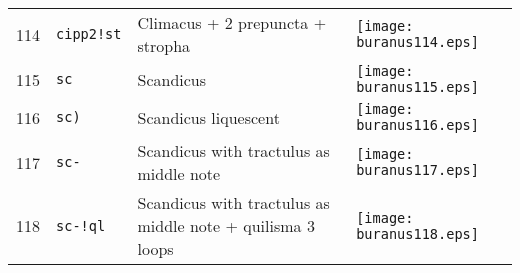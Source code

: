 \documentclass{scrarticle}
\begin{document}
\begin{longtable}{l|l|l|l}
114 & \texttt{cipp2!st} & Climacus + 2 prepuncta + stropha & \texttt{[image: buranus114.eps]} \\
115 & \texttt{sc} & Scandicus & \texttt{[image: buranus115.eps]} \\
116 & \texttt{sc)} & Scandicus liquescent & \texttt{[image: buranus116.eps]} \\
117 & \texttt{sc-} & Scandicus with tractulus as middle note & \texttt{[image: buranus117.eps]} \\
118 & \texttt{sc-!ql} & Scandicus with tractulus as middle note + quilisma 3 loops & \texttt{[image: buranus118.eps]} \\\end{longtable}
\end{document}
